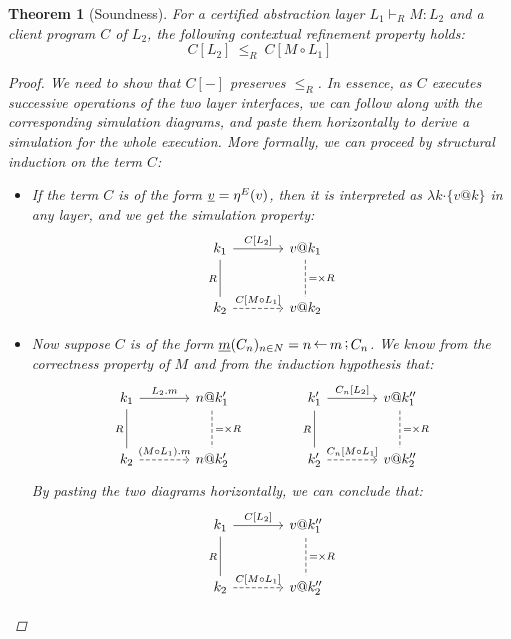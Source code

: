 \documentclass[11pt,oneside,draft]{book}
\newtheorem{theorem}{Theorem}[chapter]
\theoremstyle{definition}
\newcommand{\bdot}{\boldsymbol{\cdot}}
\newcommand{\ul}[1]{%
  \underline{\smash{#1}}
}
\begin{document}
\begin{theorem}[Soundness] %
For a certified abstraction layer $L_1 \vdash_R M : L_2$
and a client program $C$ of $L_2$,
the following \emph{contextual refinement} property holds:
\[
  C[L_2] \: \le_R \: C[M \circ L_1]
\]
\begin{proof}
We need to show that $C[-]$ preserves $\le_R$.
In essence,
as $C$ executes successive operations of
the two layer interfaces,
we can follow along with the corresponding
simulation diagrams,
and paste them horizontally to derive a simulation
for the whole execution.
More formally,
we can proceed
by structural induction on the term $C$:
\begin{itemize}
  \item
    If the term $C$ is of the form $\ul{v} = \eta^E(v)$,
    then it is interpreted as $\lambda k \bdot \{v@k\}$
    in any layer,
    and we get the simulation property:
    \[
      \begin{tikzcd}[sep=large]
        k_1 \ar[r, "{C[L_2]}"] \ar[d, "R"', dash] &
        v@k_1 \ar[d, "{=} \times R", dash, dashed] \\
        k_2 \ar[r, "{C[M \circ L_1]}", dashed] &
        v@k_2
      \end{tikzcd}
    \]
  \item
    Now suppose $C$ is of the form
    $\ul{m}(C_n)_{n \in N} = n \mathop\leftarrow m \mathop; C_n$.
    We know from the correctness property of $M$ and
    from the induction hypothesis that:
    \[
      \begin{tikzcd}[sep=large]
        k_1 \ar[r, "L_2.m"] \ar[d, "R"', dash] &
        n@k_1' \ar[d, "{=} \times R", dash, dashed] \\
        k_2 \ar[r, "(M \circ L_1).m", dashed] &
        n@k_2'
      \end{tikzcd}
      \qquad \qquad
      \begin{tikzcd}[sep=large]
        k_1' \ar[r, "{C_n[L_2]}"] \ar[d, "R"', dash] &
        v@k_1'' \ar[d, "{=} \times R", dash, dashed] \\
        k_2' \ar[r, "{C_n[M \circ L_1]}", dashed] &
        v@k_2''
      \end{tikzcd}
    \]
    By pasting the two diagrams horizontally,
    we can conclude that:
    \[
      \begin{tikzcd}[sep=large]
        k_1 \ar[r, "{C[L_2]}"] \ar[d, "R"', dash] &
        v@k_1'' \ar[d, "{=} \times R", dash, dashed] \\
        k_2 \ar[r, "{C[M \circ L_1]}", dashed] &
        v@k_2''
      \end{tikzcd}
    \]
\end{itemize}
\end{proof}
\end{theorem}
\end{document}
